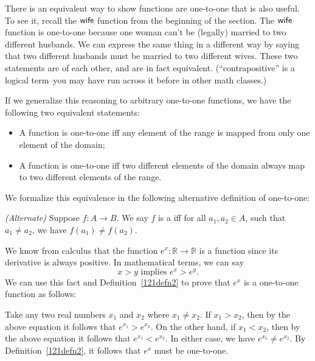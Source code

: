 There is an equivalent way to show functions are one-to-one that is also useful.  To see it, recall the $\sf{wife}$ function from the beginning of the section.  The $\sf{wife}$ function is one-to-one because one woman can't be (legally) married to two different husbands. We can express the same thing in a different way by saying that two different husbands must be married to two different wives. These two statements are  of each other, and are in fact equivalent.  (``contrapositive'' is a logical term--you may have run across it before in other math classes.)
 
If we generalize this reasoning to arbitrary one-to-one functions, we have the following two equivalent statements:
\begin{itemize}
\item
A function is one-to-one iff any element of the range is mapped from only one element of the domain;
\item
A function is one-to-one iff two different elements of the domain always map to two different elements of the range.
\end{itemize}

We formalize this equivalence in the following alternative definition of one-to-one:

\begin{defn} \label{121defn2}\emph{(Alternate)}
Suppose $f \colon A \to B$. We say $f$ is a  iff for all $a_1,a_2 \in A$, such that $a_1 \neq a_2$, we have $f(a_1) \neq f(a_2)$. 
\end{defn}

\begin{example}{}  We know from calculus that the function $e^x: \mathbb{R} \rightarrow \mathbb{R}$ is a  function since its derivative is always positive.  In mathematical terms, we can say
\[ x > y \text{ implies  } e^x > e^y.\]
We can use this fact and Definition~\ref{121defn2} to prove that $e^x$  is a one-to-one function as follows:

Take any two real numbers $x_1$ and $x_2$ where $x_1 \neq x_2$. If $x_1 > x_2$, then by the above equation it follows that $e^{x_1} > e^{x_2}$. On the other hand, 
if $x_1 < x_2$, then by the above equation it follows that $e^{x_1} < e^{x_2}$.  In either case, we have  $e^{x_1} \neq e^{x_2}$. By Definition~\ref{121defn2}, it follows that $e^x$ must be one-to-one.
\end{example}

